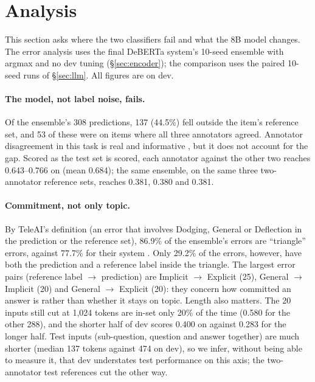 \section{Analysis}\label{sec:analysis}

This section asks where the two classifiers fail and what the 8B model changes. The
error analysis uses the final DeBERTa system's 10-seed ensemble with argmax and no dev
tuning (\S\ref{sec:encoder}); the comparison uses the paired 10-seed runs of
\S\ref{sec:llm}. All figures are on dev.

\paragraph{The model, not label noise, fails.}
Of the ensemble's 308 predictions, 137 (44.5\%) fell outside the item's reference set,
and 53 of these were on items where all three annotators agreed. Annotator disagreement
in this task is real and informative \citep{uma2021learning}, but it does not account for
the gap. Scored as the test set is scored, each annotator against the other two reaches
0.643--0.766 on \Stwo{} (mean 0.684); the same ensemble, on the same three two-annotator
reference sets, reaches 0.381, 0.380 and 0.381.

\paragraph{Commitment, not only topic.}
By TeleAI's definition (an error that involves Dodging, General or Deflection in the
prediction or the reference set), 86.9\% of the ensemble's errors are ``triangle'' errors,
against 77.7\% for their system \citep{shi-etal-2026-teleai}. Only 29.2\% of the errors,
however, have both the prediction and a reference label inside the triangle. The largest
error pairs (reference label $\rightarrow$ prediction) are Implicit $\rightarrow$ Explicit
(25), General $\rightarrow$ Implicit (20) and General $\rightarrow$ Explicit (20): they
concern how committed an answer is rather than whether it stays on topic. Length also matters. The 20 inputs still cut at 1,024 tokens are
in-set only 20\% of the time (0.580 for the other 288), and the shorter half of dev scores
0.400 on \Stwo{} against 0.283 for the longer half. Test inputs (sub-question, question and answer together) are much shorter (median
137 tokens against 474 on dev), so we infer, without being able to measure it, that dev
understates test performance on this axis; the two-annotator test references cut the
other way.

